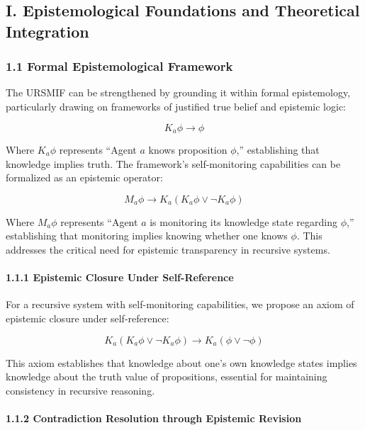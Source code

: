\documentclass[
]{article}
\begin{document}
\subsection{I. Epistemological Foundations and Theoretical
Integration}\label{i.-epistemological-foundations-and-theoretical-integration}

\subsubsection{1.1 Formal Epistemological
Framework}\label{formal-epistemological-framework}

The URSMIF can be strengthened by grounding it within formal
epistemology, particularly drawing on frameworks of justified true
belief and epistemic logic:

\[K_a \phi \rightarrow \phi\]

Where \(K_a \phi\) represents ``Agent \(a\) knows proposition
\(\phi\),'' establishing that knowledge implies truth. The framework's
self-monitoring capabilities can be formalized as an epistemic operator:

\[M_a \phi \rightarrow K_a(K_a \phi \lor \neg K_a \phi)\]

Where \(M_a \phi\) represents ``Agent \(a\) is monitoring its knowledge
state regarding \(\phi\),'' establishing that monitoring implies knowing
whether one knows \(\phi\). This addresses the critical need for
epistemic transparency in recursive systems.

\paragraph{1.1.1 Epistemic Closure Under
Self-Reference}\label{epistemic-closure-under-self-reference}

For a recursive system with self-monitoring capabilities, we propose an
axiom of epistemic closure under self-reference:

\[K_a(K_a \phi \lor \neg K_a \phi) \rightarrow K_a(\phi \lor \neg \phi)\]

This axiom establishes that knowledge about one's own knowledge states
implies knowledge about the truth value of propositions, essential for
maintaining consistency in recursive reasoning.

\paragraph{1.1.2 Contradiction Resolution through Epistemic
Revision}\label{contradiction-resolution-through-epistemic-revision}
\end{document}
